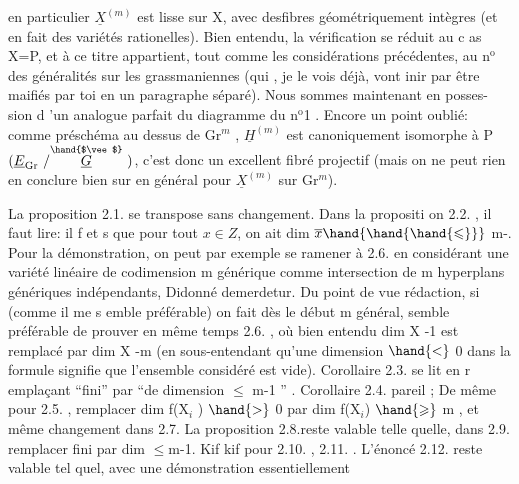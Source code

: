 
en particulier $\underline{X}^{(m)}$ est lisse sur X, avec des\hand{/}fibres géométriquement
intègres (et en fait des variétés rationelles). Bien entendu, la
vérification se réduit au c as X=P, et à ce titre appartient, tout
\margin{|}comme les considérations précédentes, au n$^{\text{o}}$ des généralités sur les
grassmaniennes (qui , je le vois déjà, vont inir par être maifiés
par toi en un paragraphe séparé). Nous sommes maintenant en posses-%
sion d 'un analogue parfait du diagramme du n$^{\text{o}}$1 . Encore un point
oublié: comme préschéma au dessus de Gr$^{m}$ , $\underline{H}^{(m)}$ est canoniquement
isomorphe à P$(\underline{E}_{\mathrm{Gr}}\ /\overset{\hand{$\vee$}}{\underline{G}}\ )$, c'est donc un excellent fibré projectif
(mais on ne peut rien en conclure bien sur en général pour $\underline{X}^{(m)}$ sur
Gr$^{m}$).

La proposition 2.1. se transpose sans changement. Dans la
propositi on 2.2. , il faut lire: il f et s que pour tout $x \in Z$, on
ait  dim $\overline{x} \hand{\hand{\hand{\leqslant}}}$ m-. Pour la démonstration, on peut par exemple
se ramener à 2.6. en considérant une  variété linéaire de
codimension m générique comme intersection de m hyperplans génériques
indépendants, Didonné demerdetur. Du point de vue rédaction, si
(comme il me s emble préférable) on fait dès le début m général, 
semble préférable de prouver en même temps 2.6. , où bien entendu
dim X -1 est remplacé par dim X -m (en sous-entendant qu'une dimension
$\hand{<}$ 0 dans la formule signifie que l'ensemble considéré est vide).
Corollaire 2.3. se lit en r emplaçant ``fini'' par ``de dimension $\leqslant$ 
m-1 '' . Corollaire 2.4. pareil ; De même pour 2.5. , remplacer
dim f(X$_{i}$ ) $\hand{>}$ 0 par dim f(X$_{i}$) $\hand{\geqslant}$ m , et même changement dans 2.7.
La proposition 2.8.reste valable telle quelle, dans 2.9. remplacer
fini par dim $\leqslant$m-1. Kif kif pour 2.10. , 2.11. . L'énoncé
2.12. reste valable tel quel, avec une démonstration essentiellement

